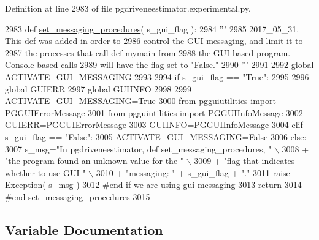 Definition at line 2983 of file pgdriveneestimator.\+experimental.\+py.


\begin{DoxyCode}
2983 \textcolor{keyword}{def }\hyperlink{namespacenegui_1_1pgdriveneestimator_a54013fc419eb559e07a5d278baa3fc6d}{set\_messaging\_procedures}( s\_gui\_flag ):
2984     \textcolor{stringliteral}{'''}
2985 \textcolor{stringliteral}{    2017\_05\_31. This def was added in order to}
2986 \textcolor{stringliteral}{    control the GUI messaging, and limit it to}
2987 \textcolor{stringliteral}{    the processes that call def mymain from}
2988 \textcolor{stringliteral}{    the GUI-based program.  Console based calls}
2989 \textcolor{stringliteral}{    will have the flag set to "False."}
2990 \textcolor{stringliteral}{    '''}
2991 
2992     \textcolor{keyword}{global} ACTIVATE\_GUI\_MESSAGING
2993 
2994     \textcolor{keywordflow}{if} s\_gui\_flag == \textcolor{stringliteral}{"True"}:
2995 
2996         \textcolor{keyword}{global} GUIERR
2997         \textcolor{keyword}{global} GUIINFO
2998 
2999         ACTIVATE\_GUI\_MESSAGING=\textcolor{keyword}{True}
3000         \textcolor{keyword}{from} pgguiutilities \textcolor{keyword}{import} PGGUIErrorMessage
3001         \textcolor{keyword}{from} pgguiutilities \textcolor{keyword}{import} PGGUIInfoMessage
3002         GUIERR=PGGUIErrorMessage
3003         GUIINFO=PGGUIInfoMessage
3004     \textcolor{keywordflow}{elif} s\_gui\_flag == \textcolor{stringliteral}{"False"}:
3005         ACTIVATE\_GUI\_MESSAGING=\textcolor{keyword}{False}
3006     \textcolor{keywordflow}{else}:
3007         s\_msg=\textcolor{stringliteral}{"In pgdriveneestimator, def set\_messaging\_procedures, "} \(\backslash\)
3008                     + \textcolor{stringliteral}{"the program found an unknown value for the "} \(\backslash\)
3009                     + \textcolor{stringliteral}{"flag that indicates whether to use GUI "} \(\backslash\)
3010                     + \textcolor{stringliteral}{"messaging: "} + s\_gui\_flag + \textcolor{stringliteral}{"."}
3011         \textcolor{keywordflow}{raise} Exception( s\_msg )
3012     \textcolor{comment}{#end if we are using gui messaging}
3013     \textcolor{keywordflow}{return}
3014 \textcolor{comment}{#end set\_messaging\_procedures}
3015 
\end{DoxyCode}


\subsection{Variable Documentation}
